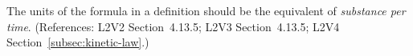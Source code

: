 The units of the  formula in a \KineticLaw definition should be
the equivalent of \emph{substance per time}.  (References: L2V2
Section~4.13.5; L2V3 Section~4.13.5; L2V4 Section~\ref{subsec:kinetic-law}.)
